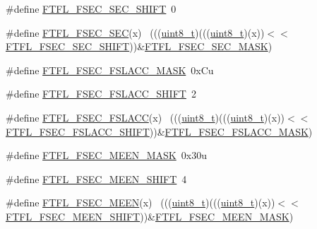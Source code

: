 \begin{DoxyCompactItemize}
\item 
\#define \hyperlink{group___f_t_f_l___register___masks_ga654233732a4fa90f3803390929c69c43}{F\+T\+F\+L\+\_\+\+F\+S\+E\+C\+\_\+\+S\+E\+C\+\_\+\+S\+H\+I\+FT}~0
\item 
\#define \hyperlink{group___f_t_f_l___register___masks_ga21d8e1c3f34080570d603748e3707f91}{F\+T\+F\+L\+\_\+\+F\+S\+E\+C\+\_\+\+S\+EC}(x)                                              ~(((\hyperlink{_p_e___types_8h_aba7bc1797add20fe3efdf37ced1182c5}{uint8\+\_\+t})(((\hyperlink{_p_e___types_8h_aba7bc1797add20fe3efdf37ced1182c5}{uint8\+\_\+t})(x))$<$$<$\hyperlink{group___f_t_f_l___register___masks_ga654233732a4fa90f3803390929c69c43}{F\+T\+F\+L\+\_\+\+F\+S\+E\+C\+\_\+\+S\+E\+C\+\_\+\+S\+H\+I\+FT}))\&\hyperlink{group___f_t_f_l___register___masks_ga0f4601a13f1fb12d6f8485c7f4365498}{F\+T\+F\+L\+\_\+\+F\+S\+E\+C\+\_\+\+S\+E\+C\+\_\+\+M\+A\+SK})
\item 
\#define \hyperlink{group___f_t_f_l___register___masks_gaf2d2429c178b2b7cd61dc4682071bb3b}{F\+T\+F\+L\+\_\+\+F\+S\+E\+C\+\_\+\+F\+S\+L\+A\+C\+C\+\_\+\+M\+A\+SK}~0x\+Cu
\item 
\#define \hyperlink{group___f_t_f_l___register___masks_gab4d62d1117f55fd4febfff6784a7195f}{F\+T\+F\+L\+\_\+\+F\+S\+E\+C\+\_\+\+F\+S\+L\+A\+C\+C\+\_\+\+S\+H\+I\+FT}~2
\item 
\#define \hyperlink{group___f_t_f_l___register___masks_ga2972b4924daf741302ab52f6ffb88fd6}{F\+T\+F\+L\+\_\+\+F\+S\+E\+C\+\_\+\+F\+S\+L\+A\+CC}(x)                                        ~(((\hyperlink{_p_e___types_8h_aba7bc1797add20fe3efdf37ced1182c5}{uint8\+\_\+t})(((\hyperlink{_p_e___types_8h_aba7bc1797add20fe3efdf37ced1182c5}{uint8\+\_\+t})(x))$<$$<$\hyperlink{group___f_t_f_l___register___masks_gab4d62d1117f55fd4febfff6784a7195f}{F\+T\+F\+L\+\_\+\+F\+S\+E\+C\+\_\+\+F\+S\+L\+A\+C\+C\+\_\+\+S\+H\+I\+FT}))\&\hyperlink{group___f_t_f_l___register___masks_gaf2d2429c178b2b7cd61dc4682071bb3b}{F\+T\+F\+L\+\_\+\+F\+S\+E\+C\+\_\+\+F\+S\+L\+A\+C\+C\+\_\+\+M\+A\+SK})
\item 
\#define \hyperlink{group___f_t_f_l___register___masks_ga69ec5c88469db83b68d6984b293073a4}{F\+T\+F\+L\+\_\+\+F\+S\+E\+C\+\_\+\+M\+E\+E\+N\+\_\+\+M\+A\+SK}~0x30u
\item 
\#define \hyperlink{group___f_t_f_l___register___masks_ga52f5037890e8b5415825336203a71000}{F\+T\+F\+L\+\_\+\+F\+S\+E\+C\+\_\+\+M\+E\+E\+N\+\_\+\+S\+H\+I\+FT}~4
\item 
\#define \hyperlink{group___f_t_f_l___register___masks_ga69aa03e33f6e979e80bbc0bcd958f306}{F\+T\+F\+L\+\_\+\+F\+S\+E\+C\+\_\+\+M\+E\+EN}(x)                                            ~(((\hyperlink{_p_e___types_8h_aba7bc1797add20fe3efdf37ced1182c5}{uint8\+\_\+t})(((\hyperlink{_p_e___types_8h_aba7bc1797add20fe3efdf37ced1182c5}{uint8\+\_\+t})(x))$<$$<$\hyperlink{group___f_t_f_l___register___masks_ga52f5037890e8b5415825336203a71000}{F\+T\+F\+L\+\_\+\+F\+S\+E\+C\+\_\+\+M\+E\+E\+N\+\_\+\+S\+H\+I\+FT}))\&\hyperlink{group___f_t_f_l___register___masks_ga69ec5c88469db83b68d6984b293073a4}{F\+T\+F\+L\+\_\+\+F\+S\+E\+C\+\_\+\+M\+E\+E\+N\+\_\+\+M\+A\+SK})
$$
\end{DoxyCompactItemize}
